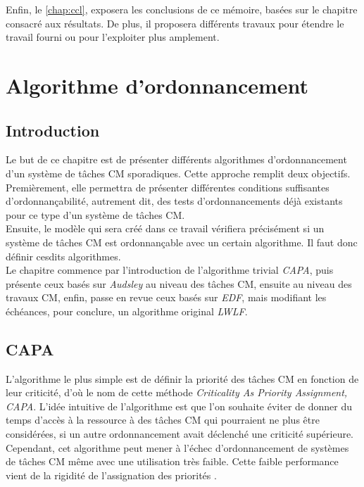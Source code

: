 \documentclass[12pt,a4paper,oneside]{book}
\theoremstyle{break}
\theoremstyle{breakplain}
\begin{document}
Enfin, le \autoref{chap:ccl}, exposera les conclusions de ce mémoire, basées sur le chapitre consacré aux résultats. De plus, il proposera différents travaux pour étendre le travail fourni ou pour l'exploiter plus amplement.\\

\chapter{Algorithme d'ordonnancement}
\label{chap:algoordo}

\section{Introduction}
Le but de ce chapitre est de présenter différents algorithmes d'ordonnancement d'un système de tâches CM sporadiques. Cette approche remplit deux objectifs.\\
Premièrement, elle permettra de présenter différentes conditions suffisantes d'ordonnançabilité, autrement dit, des tests d'ordonnancements déjà existants pour ce type d'un système de tâches CM.\\
Ensuite, le modèle qui sera créé dans ce travail vérifiera précisément si un système de tâches CM est ordonnançable avec un certain algorithme. Il faut donc définir cesdits algorithmes.\\

Le chapitre commence par l'introduction de l'algorithme trivial \textit{CAPA}, puis présente ceux basés sur \textit{Audsley} au niveau des tâches CM, ensuite au niveau des travaux CM, enfin, passe en revue ceux basés sur \textit{EDF}, mais modifiant les échéances, pour conclure, un algorithme original \textit{LWLF}.

\section{CAPA}
L'algorithme le plus simple est de définir la priorité des tâches CM en fonction de leur criticité, d'où le nom de cette méthode \textit{Criticality As Priority Assignment, CAPA}. L'idée intuitive de l'algorithme est que l'on souhaite éviter de donner du temps d'accès à la ressource à des tâches CM qui pourraient ne plus être considérées, si un autre ordonnancement avait déclenché une criticité supérieure. Cependant, cet algorithme peut mener à l'échec d'ordonnancement de systèmes de tâches CM même avec une utilisation très faible. Cette faible performance vient de la rigidité de l'assignation des priorités \cite{de2009scheduling}.\\
\end{document}
